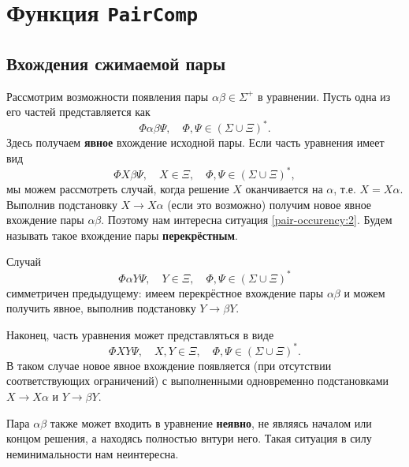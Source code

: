 \documentclass[12pt]{article}
\begin{document}
\section{Функция \texttt{PairComp}} \label{pairComp}


\subsection{Вхождения сжимаемой пары} \label{pair-occurency}

Рассмотрим возможности появления пары $\alpha \beta \in \Sigma^+ $ в
уравнении. Пусть одна из его частей представляется как 
\begin{equation}
  \Phi \alpha \beta \Psi, \quad \Phi, \Psi \in (\Sigma \cup \Xi)^*.
\end{equation}
Здесь получаем \textbf{явное} вхождение исходной пары. Если часть уравнения
имеет вид
\begin{equation} \label{pair-occurency:2}
  \Phi X \beta \Psi, \quad X \in \Xi, \quad \Phi, \Psi \in (\Sigma \cup \Xi)^*,
\end{equation}
мы можем рассмотреть случай, когда решение $X$ оканчивается на $\alpha$, т.е.
$X = X\alpha$. Выполнив подстановку $X \to X\alpha$ (если это возможно)
получим новое явное вхождение пары $\alpha \beta$. Поэтому нам интересна
ситуация \eqref{pair-occurency:2}. Будем называть такое вхождение пары
\textbf{перекрёстным}.

Случай
\begin{equation} \label{pair-occurency:3}
  \Phi \alpha Y \Psi, \quad Y \in \Xi, \quad \Phi, \Psi \in (\Sigma \cup \Xi)^*
\end{equation}
симметричен предыдущему: имеем перекрёстное вхождение пары $\alpha \beta$ и
можем получить явное, выполнив подстановку $Y \to \beta Y$.

Наконец, часть уравнения может представляться в виде
\begin{equation} \label{pair-occurency:4}
  \Phi X Y \Psi, \quad X, Y \in \Xi, \quad \Phi, \Psi \in (\Sigma \cup \Xi)^*.
\end{equation}
В таком случае новое явное вхождение появляется (при отсутствии соответствующих
ограничений) с выполненными одновременно подстановками $X \to X \alpha$ и
$Y \to \beta Y$.

Пара $\alpha \beta$ также может входить в уравнение \textbf{неявно}, не являясь
началом или концом решения, а находясь полностью внтури него. Такая
ситуация в силу неминимальности нам неинтересна.
\end{document}
